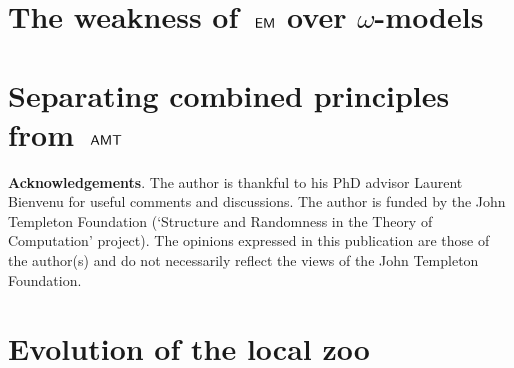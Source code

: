\documentclass[a4paper,11pt,reqno]{customart}
\newcommand{\s}[1]{\ensuremath{\sf{#1}}}
\DeclareMathOperator{\emo}{\s{EM}}
\DeclareMathOperator{\amt}{\s{AMT}}
\theoremstyle{custom}
\begin{document}
\section{The weakness of~$\emo$ over $\omega$-models}


\section{Separating combined principles from~$\amt$}\label{sect:separating-amt-combined}


%

\vspace{0.5cm}

\noindent \textbf{Acknowledgements}. The author is thankful to his PhD advisor Laurent Bienvenu
for useful comments and discussions. The author is funded by the John Templeton Foundation (`Structure and Randomness in the Theory of Computation' project). The opinions expressed in this publication are those of the author(s) and do not necessarily reflect the views of the John Templeton Foundation.

\vspace{0.5cm}




\clearpage
\appendix

\section{Evolution of the local zoo}

\end{document}
